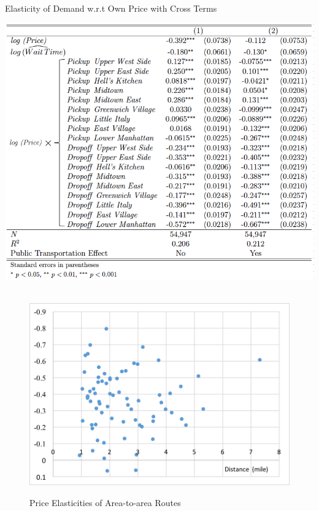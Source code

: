 \begin{table}[h]
\centering
\caption{Elasticity of Demand w.r.t Own Price with Cross Terms}\label{tab:lnfare_cross_regression}
\vspace{0.2cm}
\includegraphics[width=16cm]{Tables/lnfare_cross_regression.png}
\end{table}

\begin{figure}[h]
\centering
\caption{Price Elasticities of Area-to-area Routes }\label{fig:distance_elasticity}\\
\vspace{0.2cm}
\includegraphics[width=12cm]{Figures/distance_elasticity.png}
\vspace{1.0cm}
\end{figure}


